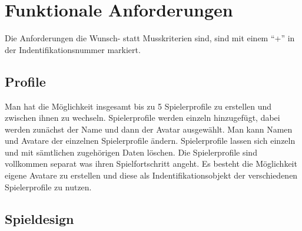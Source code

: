 \section{Funktionale Anforderungen}

Die Anforderungen die Wunsch- statt Musskriterien sind, sind mit einem "`+"' in der Indentifikationsnummer markiert.

\subsection{Profile}

\begin{requirements}
	Man hat die Möglichkeit insgesamt bis zu 5 Spielerprofile zu erstellen und zwischen ihnen zu wechseln.
	 Spielerprofile werden einzeln hinzugefügt, dabei werden zunächst der Name und dann der Avatar ausgewählt.
	 Man kann Namen und Avatare der einzelnen Spielerprofile ändern.
	 Spielerprofile lassen sich einzeln und mit sämtlichen zugehörigen Daten löschen.
	Die Spielerprofile sind vollkommen separat was ihren Spielfortschritt angeht.
	Es besteht die Möglichkeit eigene Avatare zu erstellen und diese als Indentifikationsobjekt der verschiedenen Spielerprofile zu nutzen.
\end{requirements}

\subsection{Spieldesign}

